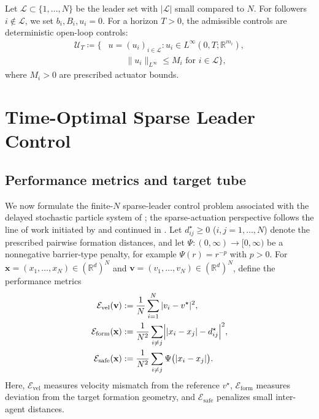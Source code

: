 \documentclass[pdflatex,sn-mathphys-num]{sn-jnl}%
\numberwithin{equation}{section}
\theoremstyle{thmstyleone}%
\theoremstyle{remark}
\theoremstyle{definition}
\newcommand{\R}{\mathbb{R}}
\newcommand{\calL}{\mathcal{L}}
\newcommand{\calU}{\mathcal{U}}
\newcommand{\calE}{\mathcal{E}}
\newcommand{\vstar}{v^{\star}}
\begin{document}
Let $\calL\subset\{1,\dots,N\}$ be the leader set with $|\calL|$ small
compared to $N$. For followers $i\notin\calL$, we set $b_i, B_i, u_i = 0$.
For a horizon $T>0$, the admissible controls are deterministic open-loop
controls:
\begin{equation}\label{eq:admissible}
\begin{aligned}
  \calU_T \coloneqq \bigl\{ &u=(u_i)_{i\in\calL} :
    u_i \in L^\infty(0,T;\R^{m_i}), \\[4pt]
  &\quad\quad \|u_i\|_{L^\infty}\le M_i \text{ for } i\in\calL \bigr\},
\end{aligned}
\end{equation}
where $M_i>0$ are prescribed actuator bounds.
\section{Time-Optimal Sparse Leader Control}
\label{sec:control}
\subsection{Performance metrics and target tube}
\label{subsec:metrics}
We now formulate the finite-$N$ sparse-leader control problem associated
with the delayed stochastic particle system of ; the
sparse-actuation perspective follows the line of work initiated by
\cite{caponigro2013sparse,caponigro2015sparse} and continued in
\cite{fornasier2014mean,albi2014boltzmann,bongini2017mean}.
Let $d_{ij}^{\star}\ge 0$ ($i,j=1,\dots,N$) denote the prescribed pairwise
formation distances, and let $\Psi:(0,\infty)\to[0,\infty)$ be a nonnegative
barrier-type penalty, for example $\Psi(r)=r^{-p}$ with $p>0$. For
$\mathbf{x}=(x_1,\dots,x_N)\in(\R^d)^N$ and $\mathbf{v}=(v_1,\dots,v_N)\in(\R^d)^N$,
define the performance metrics
\begin{subequations}
\begin{align}
  \calE_{\mathrm{vel}}(\mathbf{v}) &:= \frac{1}{N}\sum_{i=1}^{N}|v_i-\vstar|^2, \label{eq:Evel}\\
  \calE_{\mathrm{form}}(\mathbf{x}) &:= \frac{1}{N^2}\sum_{i\neq j}
    \Bigl||x_i-x_j|-d_{ij}^{\star}\Bigr|^2, \label{eq:Eform}\\
  \calE_{\mathrm{safe}}(\mathbf{x}) &:= \frac{1}{N^2}\sum_{i\neq j}
    \Psi\bigl(|x_i-x_j|\bigr). \label{eq:Esafe}
\end{align}
\end{subequations}
Here, $\calE_{\mathrm{vel}}$ measures velocity mismatch from the reference
$\vstar$, $\calE_{\mathrm{form}}$ measures deviation from the target
formation geometry, and $\calE_{\mathrm{safe}}$ penalizes small inter-agent
distances.
\end{document}
